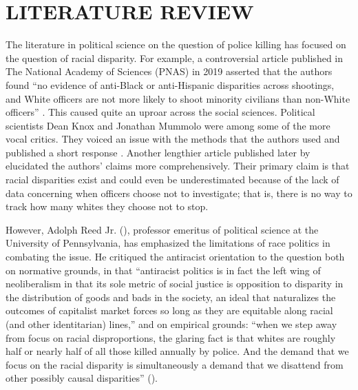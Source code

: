 \documentclass[12pt]{article}
\begin{document}
\section{LITERATURE REVIEW}

The literature in political science on the question of police killing has focused on the question of racial disparity. For example, a controversial article published in The National Academy of Sciences (PNAS) in 2019 asserted that the authors found “no evidence of anti-Black or anti-Hispanic disparities across shootings, and White officers are not more likely to shoot minority civilians than non-White officers” \parencite[15877]{johnsonOfficerCharacteristicsRacial2019}. This caused quite an uproar across the social sciences. Political scientists Dean Knox and Jonathan Mummolo were among some of the more vocal critics. They voiced an issue with the methods that the authors used and published a short response \parencite{knoxMakingInferencesRacial2020}. Another lengthier article published later by \textcite{knoxAdministrativeRecordsMask2020} elucidated the authors’ claims more comprehensively. Their primary claim is that racial disparities exist and could even be underestimated because of the lack of data concerning when officers choose not to investigate; that is, there is no way to track how many whites they choose not to stop.

However, Adolph Reed Jr. (\citeyear{reedHowRacialDisparity2016}), professor emeritus of political science at the University of Pennsylvania, has emphasized the limitations of race politics in combating the issue. He critiqued the antiracist orientation to the question both on normative grounds, in that “antiracist politics is in fact the left wing of neoliberalism in that its sole metric of social justice is opposition to disparity in the distribution of goods and bads in the society, an ideal that naturalizes the outcomes of capitalist market forces so long as they are equitable along racial (and other identitarian) lines,” and on empirical grounds: “when we step away from focus on racial disproportions, the glaring fact is that whites are roughly half or nearly half of all those killed annually by police. And the demand that we focus on the racial disparity is simultaneously a demand that we disattend from other possibly causal disparities” (\cite{reedHowRacialDisparity2016}).
\end{document}
